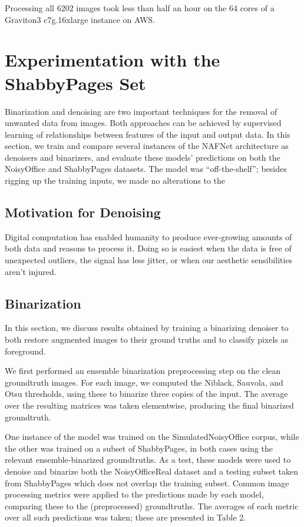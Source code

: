 \documentclass[runningheads]{llncs}
\begin{document}
Processing all 6202 images took less than half an hour on the 64 cores of a Graviton3 c7g.16xlarge instance on AWS.

\section{Experimentation with the ShabbyPages Set}
Binarization and denoising are two important techniques for the removal of unwanted data from images.
Both approaches can be achieved by supervised learning of relationships between features of the input and output data.
In this section, we train and compare several instances of the NAFNet \cite{ref_nafnet} architecture as denoisers and binarizers, and evaluate these models' predictions on both the NoisyOffice and ShabbyPages datasets.
The model was ``off-the-shelf''; besides rigging up the training inputs, we made no alterations to the 

\subsection{Motivation for Denoising}
Digital computation has enabled humanity to produce ever-growing amounts of both data and reasons to process it.
Doing so is easiest when the data is free of unexpected outliers, the signal has less jitter, or when our aesthetic sensibilities aren't injured.

\subsection{Binarization}
In this section, we discuss results obtained by training a binarizing denoiser to both restore augmented images to their ground truths and to classify pixels as foreground.

We first performed an ensemble binarization preprocessing step on the clean groundtruth images.
For each image, we computed the Niblack, Sauvola, and Otsu thresholds, using these to binarize three copies of the input. The average over the resulting matrices was taken elementwise, producing the final binarized groundtruth.

One instance of the model was trained on the SimulatedNoisyOffice corpus, while the other was trained on a subset of ShabbyPages, in both cases using the relevant ensemble-binarized groundtruths.
As a test, these models were used to denoise and binarize both the NoisyOfficeReal dataset and a testing subset taken from ShabbyPages which does not overlap the training subset.
Common image processing metrics were applied to the predictions made by each model, comparing these to the (preprocessed) groundtruths.
The averages of each metric over all such predictions was taken; these are presented in Table 2.
\end{document}
